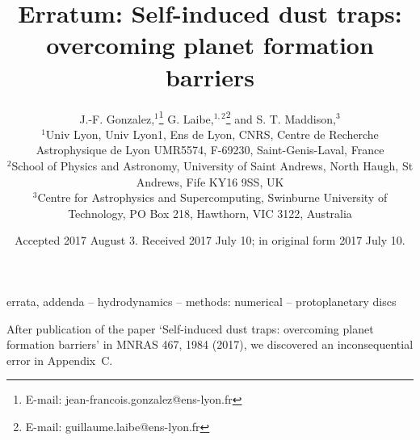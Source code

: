 \documentclass[a4paper,fleqn,usenatbib]{mnras}
\title[Self-induced dust traps]{Erratum: Self-induced dust traps: overcoming planet formation barriers}
\author[J.-F. Gonzalez et al.]{
J.-F. Gonzalez,$^{1}$\thanks{E-mail: jean-francois.gonzalez@ens-lyon.fr}
G. Laibe,$^{1,2}$\thanks{E-mail: guillaume.laibe@ens-lyon.fr}
and S. T. Maddison,$^{3}$
\\
$^{1}$Univ Lyon, Univ Lyon1, Ens de Lyon, CNRS, Centre de Recherche Astrophysique de Lyon UMR5574, F-69230, Saint-Genis-Laval, France\\
$^{2}$School of Physics and Astronomy, University of Saint Andrews,
North Haugh, St Andrews, Fife KY16 9SS, UK\\
$^{3}$Centre for Astrophysics and Supercomputing, Swinburne University of Technology, PO Box 218, Hawthorn, VIC 3122, Australia
}
\date{Accepted 2017 August 3. Received 2017 July 10; in original form 2017 July 10.}
\begin{document}
\label{firstpage}
\pagerange{\pageref{firstpage}--\pageref{lastpage}}
\maketitle


\begin{keywords}
errata, addenda -- hydrodynamics -- methods: numerical -- protoplanetary discs
\end{keywords}



After publication of the paper `Self-induced dust traps: overcoming planet formation barriers' in MNRAS 467, 1984 (2017), we discovered an inconsequential error in Appendix~C.
\end{document}
